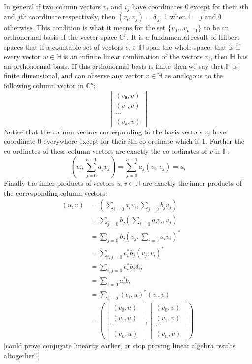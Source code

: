 In general if two column vectors $v_i$ and $v_j$ have coordinates 0 except for their $i$th and $j$th coordinate respectively, then $(v_i, v_j) = \delta_{ij}$, 1 when $i = j$ and 0 otherwise. This condition is what it means for the set $\{v_0 \dots v_{n-1}\}$ to be an orthonormal basis of the vector space $\mathbb{C}^n$. It is a fundamental result of Hilbert spaces that if a countable set of vectors $v_i \in \mathbb{H}$ span the whole space, that is if every vector $w \in \mathbb{H}$ is an infinite linear combination of the vectors $v_i$, then $\mathbb{H}$ has an orthonormal basis. If this orthonormal basis is finite then we say that $\mathbb{H}$ is finite dimensional, and can observe any vector $v \in \mathbb{H}$ as analogous to the following column vector in $\mathbb{C}^n$:
\[\left[\begin{matrix}
(v_0, v)\\
(v_1, v)\\
\cdots\\
(v_n, v)
\end{matrix}\right]\]
Notice that the column vectors corresponding to the basis vectors $v_i$ have coordinate 0 everywhere except for their $i$th co-ordinate which is 1. Further the co-ordinates of these column vectors are exactly the co-ordinates of $v$ in $\mathbb{H}$:
\[\left(v_i, \sum_{j=0}^{n-1} a_jv_j\right) = \sum_{j=0}^{n-1} a_j\left(v_i, v_j\right) = a_i\]
Finally the inner products of vectors $u, v \in \mathbb{H}$ are exactly the inner products of the corresponding column vectors:
\begin{align*}
(u, v) &= \left(\sum_{i=0}a_iv_i, \sum_{j=0} b_jv_j\right)
\\&= \sum_{j=0}b_j \left(\sum_{i=0}a_iv_i, v_j\right)
\\&= \sum_{j=0}b_j \left(v_j, \sum_{i=0}a_iv_i\right)^*
\\&= \sum_{i,j=0}a_i^*b_j \left(v_j, v_i\right)^*
\\&= \sum_{i,j=0}a_i^*b_j \delta_{ij}
\\&= \sum_{i=0}a_i^*b_i
\\&= \sum_{i=0}(v_i, u)^*(v_i, v)
\\&= \left(
\left[\begin{matrix}
	(v_0, u)\\
	(v_1, u)\\
	\cdots\\
	(v_n, u)
\end{matrix}\right]
,
\left[\begin{matrix}
	(v_0, v)\\
	(v_1, v)\\
	\cdots\\
	(v_n, v)
\end{matrix}\right]
\right)
\end{align*}
[could prove conjugate linearity earlier, or stop proving linear algebra results altogether!!]

